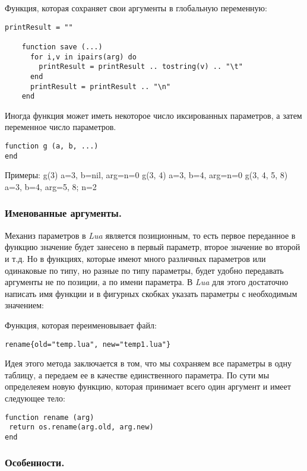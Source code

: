 Функция, которая сохраняет свои аргументы в глобальную переменную:
\begin{lstlisting}
printResult = ""
    
    function save (...)
      for i,v in ipairs(arg) do
        printResult = printResult .. tostring(v) .. "\t"
      end
      printResult = printResult .. "\n"
    end
\end{lstlisting} 

Иногда функция может иметь некоторое число иксированных параметров, а затем переменное число параметров. 

\begin{lstlisting}
function g (a, b, ...)
end
\end{lstlisting}

Примеры:      
\newline g(3) a=3, b=nil, arg={n=0}
\newline g(3, 4) a=3, b=4, arg={n=0}
\newline g(3, 4, 5, 8) a=3, b=4, arg={5, 8; n=2}


\subsubsection{Именованные аргументы.}
Механиз параметров в \emph{Lua} является позиционным, то есть первое переданное в функцию значение будет занесено в первый параметр, второе значение во второй и т.д. Но в функциях, которые имеют много различных параметров или одинаковые по типу, но разные по типу параметры, будет удобно передавать аргументы не по позиции, а по имени параметра. В \emph{Lua} для этого достаточно написать имя функции и в фигурных скобках указать параметры с необходимым значением: 

Функция, которая переименовывает файл:
\begin{lstlisting}
rename{old="temp.lua", new="temp1.lua"}
\end{lstlisting}

Идея этого метода заключается в том, что мы сохраняем все параметры в одну таблицу, а передаем ее в качестве единственного параметра. По сути мы определеяем новую функцию, которая принимает всего один аргумент и имеет следующее тело:

\begin{lstlisting}
function rename (arg)
 return os.rename(arg.old, arg.new)
end
\end{lstlisting}

\subsubsection{Особенности.}

